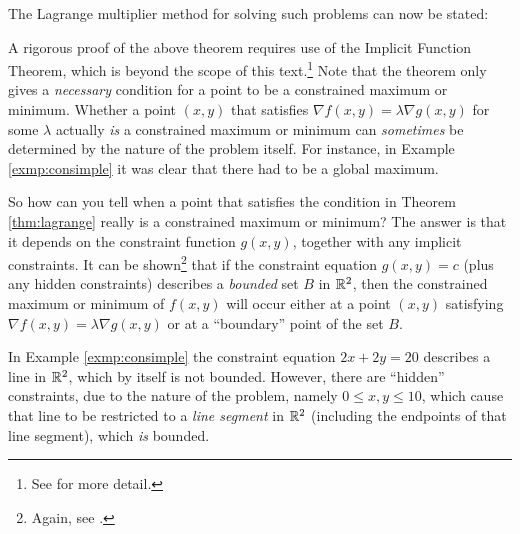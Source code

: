 The Lagrange multiplier method for solving such problems can now be stated:


A rigorous proof of the above theorem requires use of the Implicit Function Theorem, which is beyond the scope of this
text.\footnote{See \cite[\S\,6.8]{tm} for more detail.} Note that the theorem only gives a \emph{necessary} condition
for a point to be a constrained maximum or minimum. Whether a point $(x,y)$ that satisfies
$\nabla f(x,y) = \lambda \nabla g(x,y)$ for some $\lambda$ actually \emph{is} a constrained maximum or minimum can
\emph{sometimes} be determined by the nature of the problem itself. For instance, in Example \ref{exmp:consimple} it was
clear that there had to be a global maximum.

So how can you tell when a point that satisfies the condition in Theorem \ref{thm:lagrange} really is a
constrained maximum or minimum? The answer is that it depends on the constraint function $g(x,y)$, together with any
implicit constraints. It can be shown\footnote{Again, see \cite{tm}.} that if the constraint equation $g(x,y)=c$ (plus
any hidden constraints) describes a \emph{bounded} set $B$ in $\mathbb{R}^{2}$, then the constrained maximum or minimum of
$f(x,y)$ will occur either at a point $(x,y)$ satisfying $\nabla f(x,y) = \lambda \nabla g(x,y)$ or at a ``boundary''
point of the set $B$.

In Example \ref{exmp:consimple} the constraint equation $2x+2y=20$ describes a line in $\mathbb{R}^{2}$, which by itself is
not bounded. However, there are ``hidden'' constraints, due to the nature of the problem, namely $0\le x,y \le 10$,
which cause that line to be restricted to a \emph{line segment} in $\mathbb{R}^{2}$ (including the endpoints of that line
segment), which \emph{is} bounded.

